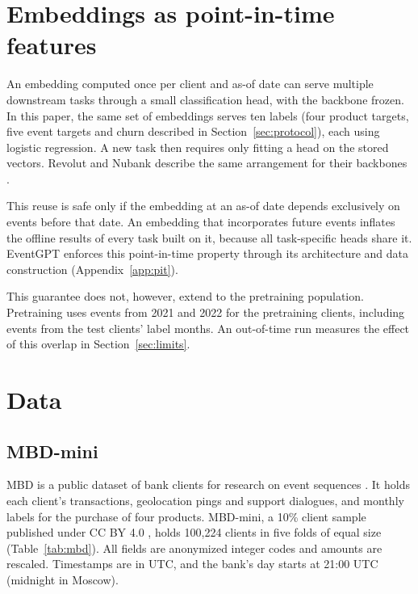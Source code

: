 \documentclass[12pt]{article}
\begin{document}
\section{Embeddings as point-in-time features}\label{sec:pit}

An embedding computed once per client and as-of date can serve multiple downstream tasks through a small classification head, with the backbone frozen. In this paper, the same set of embeddings serves ten labels (four product targets, five event targets and churn described in Section~\ref{sec:protocol}), each using logistic regression. A new task then requires only fitting a head on the stored vectors. Revolut and Nubank describe the same arrangement for their backbones \cite{pragma, nuformer}.

This reuse is safe only if the embedding at an as-of date depends exclusively on events before that date. An embedding that incorporates future events inflates the offline results of every task built on it, because all task-specific heads share it. EventGPT enforces this point-in-time property through its architecture and data construction (Appendix~\ref{app:pit}).

This guarantee does not, however, extend to the pretraining population. Pretraining uses events from 2021 and 2022 for the pretraining clients, including events from the test clients' label months. An out-of-time run measures the effect of this overlap in Section~\ref{sec:limits}.

\section{Data}\label{sec:data}

\subsection{MBD-mini}

MBD is a public dataset of bank clients for research on event sequences \cite{mbd}. It holds each client's transactions, geolocation pings and support dialogues, and monthly labels for the purchase of four products. MBD-mini, a 10\% client sample published under CC BY 4.0 \cite{mbdmini}, holds 100,224 clients in five folds of equal size (Table~\ref{tab:mbd}). All fields are anonymized integer codes and amounts are rescaled. Timestamps are in UTC, and the bank's day starts at 21:00 UTC (midnight in Moscow).
\end{document}
